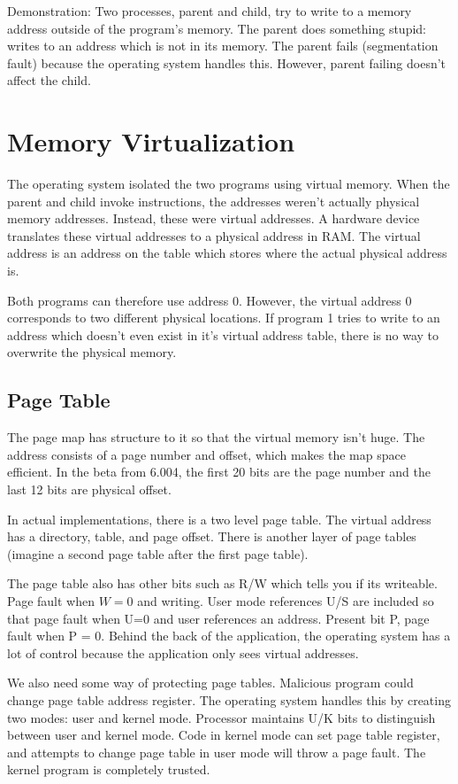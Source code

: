 \documentclass[psamsfonts]{amsart}
\begin{document}
Demonstration: Two processes, parent and child, try to write to a memory address outside of the program's memory. The parent does something stupid: writes to an address which is not in its memory. The parent fails (segmentation fault) because the operating system handles this. However, parent failing doesn't affect the child.

\section{Memory Virtualization}

The operating system isolated the two programs using virtual memory. When the parent and child invoke instructions, the addresses weren't actually physical memory addresses. Instead, these were virtual addresses. A hardware device translates these virtual addresses to a physical address in RAM. The virtual address is an address on the table which stores where the actual physical address is.

Both programs can therefore use address 0. However, the virtual address 0 corresponds to two different physical locations. If program 1 tries to write to an address which doesn't even exist in it's virtual address table, there is no way to overwrite the physical memory.

\subsection{Page Table}

The page map has structure to it so that the virtual memory isn't huge. The address consists of a page number and offset, which makes the map space efficient. In the beta from 6.004, the first 20 bits are the page number and the last 12 bits are physical offset.

In actual implementations, there is a two level page table. The virtual address has a directory, table, and page offset. There is another layer of page tables (imagine a second page table after the first page table).

The page table also has other bits such as R/W which tells you if its writeable. Page fault when $W = 0$ and writing. User mode references U/S are included so that page fault when U=0 and user references an address. Present bit P, page fault when P = 0. Behind the back of the application, the operating system has a lot of control because the application only sees virtual addresses.

We also need some way of protecting page tables. Malicious program could change page table address register. The operating system handles this by creating two modes: user and kernel mode. Processor maintains U/K bits to distinguish between user and kernel mode. Code in kernel mode can set page table register, and attempts to change page table in user mode will throw a page fault. The kernel program is completely trusted.
\end{document}
